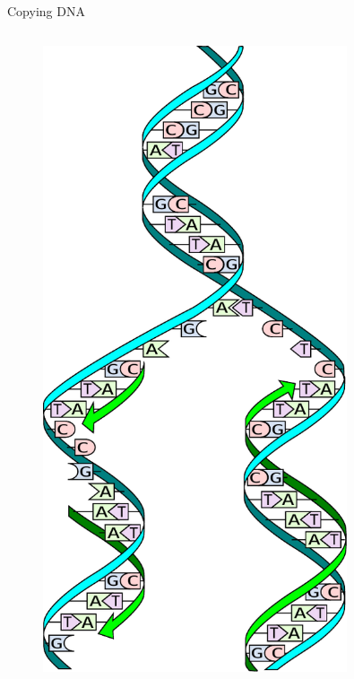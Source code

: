 \documentclass[pdf]{beamer}
\begin{document}
\begin{frame}{Copying DNA}
  \begin{columns}
    \begin{column}{0.3\textwidth}
      \begin{figure}[hb]
        \includegraphics[width=0.8\textwidth]{images/DNA_replication_split}

\end{figure}
\end{column}
\end{columns}
\end{frame}
\end{document}
